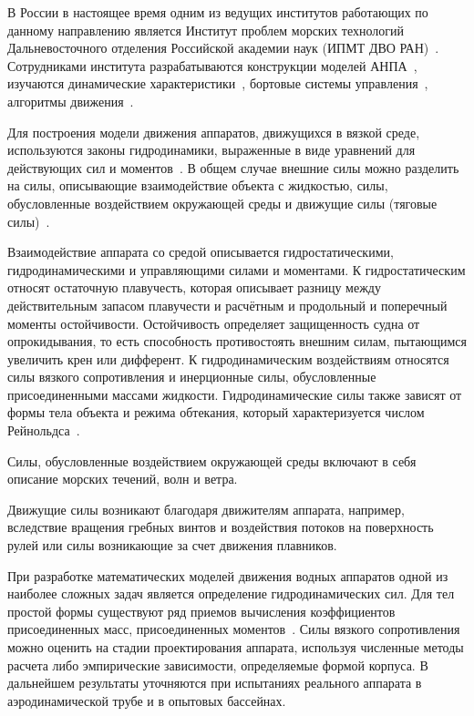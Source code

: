 В России в настоящее время одним из ведущих институтов работающих по данному направлению является Институт проблем морских технологий Дальневосточного отделения Российской академии наук (ИПМТ ДВО РАН)~\cite{Ageev, Kiselev_2012, Inzarcev_2018_book}. Сотрудниками института разрабатываются конструкции моделей АНПА~\cite{Boreyko_2011, Iznarcev_2007}, изучаются динамические характеристики~\cite{Kiselev_2012}, бортовые системы управления~\cite{Iznarcev_2005}, алгоритмы движения~\cite{Kiselev_2004}.

Для построения модели движения аппаратов, движущихся в вязкой среде, используются законы гидродинамики, выраженные в виде уравнений для действующих сил и моментов~\cite{Ageev}. В общем случае внешние силы можно разделить на силы, описывающие взаимодействие объекта с жидкостью, силы, обусловленные воздействием окружающей среды и движущие силы (тяговые силы)~\cite{Fossen2}. %

Взаимодействие аппарата со средой описывается гидростатическими, гидродинамическими и управляющими силами и моментами. К гидростатическим относят остаточную плавучесть, которая описывает разницу между действительным запасом плавучести и расчётным и продольный и поперечный моменты остойчивости. Остойчивость определяет защищенность судна от опрокидывания, то есть способность противостоять внешним силам, пытающимся увеличить крен или дифферент. К гидродинамическим воздействиям относятся силы вязкого сопротивления и инерционные силы, обусловленные присоединенными массами жидкости. Гидродинамические силы также зависят от формы тела объекта и режима обтекания, который характеризуется числом Рейнольдса~\cite{Ageev}.

Силы, обусловленные воздействием окружающей среды включают в себя описание морских течений, волн и ветра.

Движущие силы возникают благодаря движителям аппарата, например, вследствие вращения гребных винтов и воздействия потоков на поверхность рулей или силы возникающие за счет движения плавников.

При разработке математических моделей движения водных аппаратов одной из наиболее сложных задач является определение гидродинамических сил. Для тел простой формы существуют ряд приемов вычисления коэффициентов присоединенных масс, присоединенных моментов~\cite{Pantov_etc_1973, Korotkin}. Силы вязкого сопротивления можно оценить на стадии проектирования аппарата, используя численные методы расчета либо эмпирические зависимости, определяемые формой корпуса. В дальнейшем результаты уточняются при испытаниях реального аппарата в аэродинамической трубе и в опытовых бассейнах.

